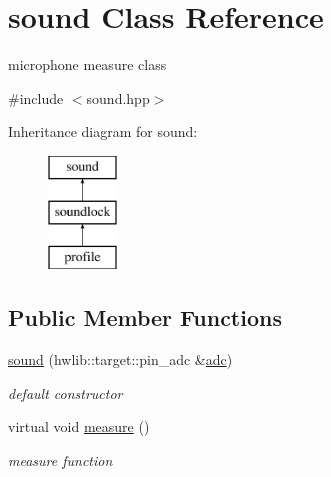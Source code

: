 \hypertarget{classsound}{}\section{sound Class Reference}
\label{classsound}


microphone measure class  




{\ttfamily \#include $<$sound.\+hpp$>$}

Inheritance diagram for sound\+:\begin{figure}[H]
\begin{center}
\leavevmode
\includegraphics[height=3.000000cm]{classsound}
\end{center}
\end{figure}
\subsection*{Public Member Functions}
\begin{DoxyCompactItemize}
\item 
\hyperlink{classsound_adb8acce21f8278fbf04134748bf8b4d8}{sound} (hwlib\+::target\+::pin\+\_\+adc \&\hyperlink{classsound_a1b4c38e994daa1b3e9006852d3d9242a}{adc})
\begin{DoxyCompactList}\small\item\em default constructor \end{DoxyCompactList}\item 
virtual void \hyperlink{classsound_a40bc8ced8bd7071f1c727a9d4845aade}{measure} ()
\begin{DoxyCompactList}\small\item\em measure function \end{DoxyCompactList}\end{DoxyCompactItemize}
